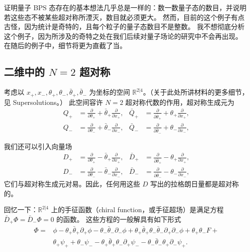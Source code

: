 证明量子 BPS 态存在的基本想法几乎总是一样的：数一数量子态的数目，并说明若这些态不被某些超对称所湮灭，数目就必须更大。
然而，目前的这个例子有点古怪，因为统计是奇特的，且每个粒子的量子态数目不是整数。
我不想彻底分析这个例子，因为所涉及的奇特之处在我们后续对量子场论的研究中不会再出现。
在随后的例子中，细节将更为直截了当。

\subsection{二维中的 $N=2$ 超对称}

考虑以 $x_+,x_-,\theta_+,\theta_-,\bar\theta_+,\bar\theta_-$ 为坐标的空间 $\mathbb{R}^{2|4}$。（关于此处所讲材料的更多细节，见 Supersolutions。）
此空间容许 $N=2$ 超对称代数的作用，超对称生成元为
\begin{equation}
  \tag{12.10}
  \label{eq:12-10}
  \begin{aligned}
    Q_+&=\frac{\partial}{\partial\theta_+}+\bar\theta_+\frac{\partial}{\partial x_+},
    &\bar Q_+&=\frac{\partial}{\partial\bar\theta_+}+\theta_+\frac{\partial}{\partial x_+},\\
    Q_-&=\frac{\partial}{\partial\theta_-}+\bar\theta_-\frac{\partial}{\partial x_-},
    &\bar Q_-&=\frac{\partial}{\partial\bar\theta_-}+\theta_-\frac{\partial}{\partial x_-},
  \end{aligned}
\end{equation}

我们还可以引入向量场
\begin{equation}
  \tag{12.11}
  \label{eq:12-11}
  \begin{aligned}
    D_+&=\frac{\partial}{\partial\theta_+}-\bar\theta_+\frac{\partial}{\partial x_+},
    &\bar D_+&=\frac{\partial}{\partial\bar\theta_+}-\theta_+\frac{\partial}{\partial x_+},\\
    D_-&=\frac{\partial}{\partial\theta_-}-\bar\theta_-\frac{\partial}{\partial x_-},
    &\bar D_-&=\frac{\partial}{\partial\bar\theta_-}-\theta_-\frac{\partial}{\partial x_-},
  \end{aligned}
\end{equation}
它们与超对称生成元对易。因此，任何用这些 $D$ 写出的拉格朗日量都是超对称的。

回忆一下：$\mathbb{R}^{2|4}$ 上的手征函数（chiral function，或手征超场）是满足方程 $\bar D_+\Phi=\bar D_-\Phi=0$ 的函数。
这些方程的一般解具有如下形式
\begin{equation}
  \tag{12.12}
  \label{eq:12-12}
  \begin{aligned}
    \Phi={}&\phi-\theta_+\bar\theta_+\partial_+\phi-\theta_-\bar\theta_-\partial_-\phi
    +\theta_+\bar\theta_+\theta_-\bar\theta_-\partial_+\partial_-\phi+\theta_+\theta_-F+{}\\
    &\theta_+\psi_++\theta_-\psi_--\theta_+\bar\theta_+\theta_-\partial_+\psi_-
    -\theta_-\bar\theta_-\theta_+\partial_-\psi_+.
  \end{aligned}
\end{equation}


